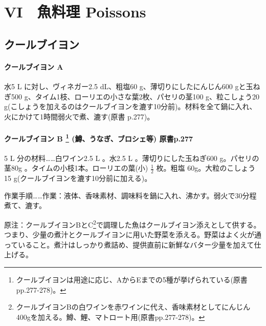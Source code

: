 \href{✓原稿下準備なし}{} \href{訳と注釈\%2020180420進行中}{}
\href{未、原文対照チェック}{} \href{未、日本語表現校正}{}
\href{未、注釈チェク}{} \href{未、原稿最終校正}{}

\hypertarget{poissons}{%
\chapter{VI　魚料理 Poissons}\label{poissons}}

\hypertarget{serie-de-courts-bouillons-de-poisson}{%
\section{クールブイヨン}\label{serie-de-courts-bouillons-de-poisson}}

\begin{recette}
\hypertarget{ux30afux30fcux30ebux30d6ux30a4ux30e8ux30f3-a}{%
\subsubsection{クールブイヨン
A}\label{ux30afux30fcux30ebux30d6ux30a4ux30e8ux30f3-a}}

水5 L に対し、ヴィネガー2.5 dL、粗塩60 g、薄切りにしたにんじん600
gと玉ねぎ500 g、タイム1枝、ローリエの小さな葉2枚、パセリの茎100
g、粒こしょう20
g(こしょうを加えるのはクールブイヨンを漉す10分前)。材料を全て鍋に入れ、火にかけて1時間弱火で煮、漉す(原書
p.277)。

\hypertarget{ux30afux30fcux30ebux30d6ux30a4ux30e8ux30f3-b-4-ux9c52ux3046ux306aux304eux30d6ux30edux30b7ux30a7ux7b49-ux539fux66f8p.277}{%
\subsubsection[クールブイヨン B (鱒、うなぎ、ブロシェ等)
原書p.277]{\texorpdfstring{クールブイヨン B \footnote{クールブイヨンは用途に応じ、AからEまでの5種が挙げられている(原書pp.277-278)。}
(鱒、うなぎ、ブロシェ等)
原書p.277}{クールブイヨン B  (鱒、うなぎ、ブロシェ等) 原書p.277}}\label{ux30afux30fcux30ebux30d6ux30a4ux30e8ux30f3-b-4-ux9c52ux3046ux306aux304eux30d6ux30edux30b7ux30a7ux7b49-ux539fux66f8p.277}}

5 L 分の材料\ldots{}\ldots{}白ワイン2.5 L 。水2.5 L
。薄切りにした玉ねぎ600 g。パセリの茎80g
。タイムの小枝1本。ローリエの葉(小) \(\frac{1}{2}\) 枚。粗塩
60g。大粒のこしょう15 g(クールブイヨンを漉す10分前に加える)。

作業手順\ldots{}\ldots{}作業：液体、香味素材、調味料を鍋に入れ、沸かす。弱火で30分程煮て、漉す。

\href{欠落アリ}{}

原注：クールブイヨンBとC\footnote{クールブイヨンBの白ワインを赤ワインに代え、香味素材としてにんじん400gを加える。鱒、鯉、マトロート用(原書pp.277-278)。}で調理した魚はクールブイヨン添えとして供する。つまり、少量の煮汁とクールブイヨンに用いた野菜を添える。野菜はよく火が通っていること。煮汁はしっかり煮詰め、提供直前に新鮮なバター少量を加えて仕上げる。
\end{recette}
